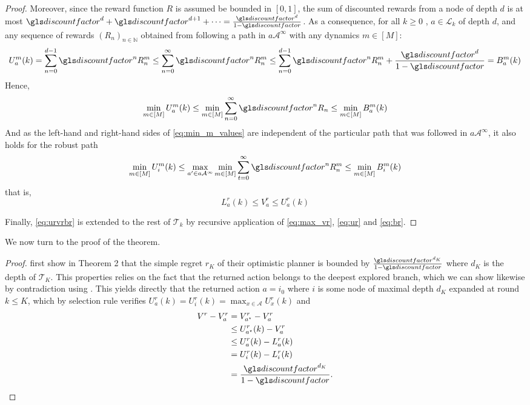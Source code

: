 \begin{subappendices}
\begin{proof}
		Moreover, since the reward function $R$ is assumed be bounded in $[0, 1]$, the sum of discounted rewards from a node of depth $d$ is at most $\discount^d + \discount^{d+1}+\dots = \frac{\discount^d}{1-\discount}$. As a consequence, for all $k \geq 0$ , $a\in\mathcal{L}_k$ of depth $d$, and any sequence of rewards $(R_n)_{n\in\mathbb{N}}$ obtained from following a path in $a\mathcal{A}^\infty$ with any dynamics $m \in [M]$:
		\begin{equation*}
		U^m_a(k) = \sum_{n=0}^{d-1} \discount^n R_n^m \leq \sum_{n=0}^\infty \discount^n R_n^m \leq \sum_{n=0}^{d-1} \discount^n R_n^m + \frac{\discount^d}{1-\discount} = B^m_a(k) 
		\end{equation*}
		Hence,
		\begin{equation}
		\label{eq:min_m_values}
		\min_{m \in [M]} U^m_a(k) \leq \min_{m \in [M]} \sum_{n=0}^\infty \discount^n R_n \leq \min_{m \in [M]} B^m_a(k)
		\end{equation}
		And as the left-hand and right-hand sides of \eqref{eq:min_m_values} are independent of the particular path that was followed in $a\mathcal{A}^\infty$, it also holds for the robust path
		\begin{equation*}
		\min_{m \in [M]} U^m_i(k) \leq \max_{a'\in a\mathcal{A}^\infty} \min_{m \in [M]} \sum_{t=0}^\infty \discount^n R_n^m \leq \min_{m \in [M]} B^m_i(k)
		\end{equation*}
		that is,
		\begin{equation}
		\label{eq:urvrbr}
		L^r_a(k) \leq V^r_a  \leq U^r_a(k)
		\end{equation}
		
		Finally, \eqref{eq:urvrbr} is extended to the rest of $\mathcal{T}_k$ by recursive application of \eqref{eq:max_vr}, \eqref{eq:ur} and \eqref{eq:br}.
	\end{proof}
	
	We now turn to the proof of the theorem.
	
	\begin{proof}
		\citet{Hren2008} first show in Theorem 2 that the simple regret $r_K$ of their optimistic planner is bounded by $\frac{\discount^{d_K}}{1 - \discount}$ where $d_K$ is the depth of $\mathcal{T}_K$. This properties relies on the fact that the returned action belongs to the deepest explored branch, which we can show likewise by contradiction using . This yields directly that the returned action $a = i_0$ where $i$ is some node of maximal depth $d_K$ expanded at round $k\leq K$, which by selection rule verifies $U_a^r(k) = U_i^r(k) = \max_{x\in\mathcal{A}} U_x^r(k)$ and
		\begin{align*}
		\label{eq:Rndn}
		V^r - V_a^r &= V_{a^{\star}}^r - V_a^r  \\
		&\leq U_{a^{\star}}^r(k) - V_a^r \\
		&\leq U_{a}^r(k) - L_a^r(k) \\
		&= U_{i}^r(k) - L_i^r(k) \\
		&= \frac{\discount^{d_K}}{1-\discount}.
		\end{align*}
		

\end{proof}
\end{subappendices}
